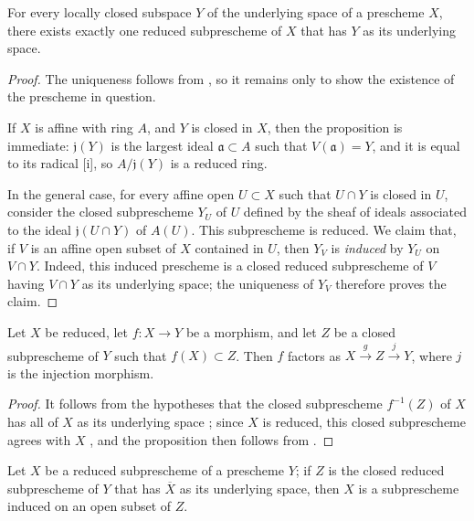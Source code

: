 \begin{proposition}[5.2.1]
\label{I.5.2.1}
For every locally closed subspace $Y$ of the underlying space of a prescheme $X$, there exists exactly one reduced subprescheme of $X$ that has $Y$ as its underlying space.
\end{proposition}

\begin{proof}
The uniqueness follows from , so it remains only to show the existence of the prescheme in question.

If $X$ is affine with ring $A$, and $Y$ is closed in $X$, then the proposition is immediate:
$\mathfrak{j}(Y)$ is the largest ideal $\mathfrak{a}\subset A$ such that $V(\mathfrak{a})=Y$, and it is equal to its radical [i], so $A/\mathfrak{j}(Y)$ is a reduced ring.

In the general case, for every affine open $U\subset X$ such that $U\cap Y$ is closed in $U$, consider the closed subprescheme $Y_U$ of $U$ defined by the sheaf of ideals associated to the ideal $\mathfrak{j}(U\cap Y)$ of $A(U)$.
This subprescheme is reduced.
We claim that, if $V$ is an affine open subset of $X$ contained in $U$, then $Y_V$ is \emph{induced} by $Y_U$ on $V\cap Y$.
Indeed, this induced prescheme is a closed reduced subprescheme of $V$ having $V\cap Y$ as its underlying space;
the uniqueness of $Y_V$ therefore proves the claim.
\end{proof}

\begin{proposition}[5.2.2]
\label{I.5.2.2}
Let $X$ be reduced, let $f:X \to Y$ be a morphism, and let $Z$ be a closed subprescheme of $Y$ such that $f(X) \subset Z$.
Then $f$ factors as $X \xrightarrow{g} Z \xrightarrow{j} Y$, where $j$ is the injection morphism.
\end{proposition}

\begin{proof}
It follows from the hypotheses that the closed subprescheme $f^{-1}(Z)$ of $X$ has all of $X$ as its underlying space ;
since $X$ is reduced, this closed subprescheme agrees with $X$ , and the proposition then follows from .
\end{proof}

\begin{corollary}[5.2.3]
\label{I.5.2.3}
Let $X$ be a reduced subprescheme of a prescheme $Y$; if $Z$ is the closed reduced subprescheme of $Y$ that has $\overline{X}$ as its underlying space, then $X$ is a subprescheme induced on an open subset of $Z$.
\end{corollary}

